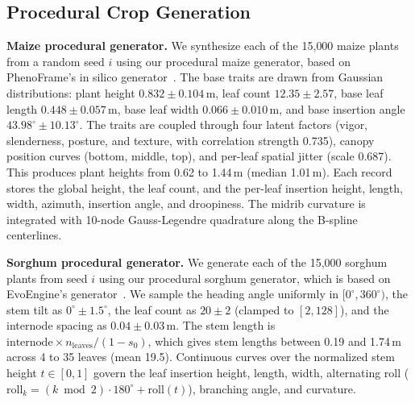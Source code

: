 \documentclass[10pt,twocolumn,letterpaper]{article}
\begin{document}
\subsection{Procedural Crop Generation}
\noindent\textbf{Maize procedural generator.}
We synthesize each of the 15{,}000 maize plants from a random seed $i$ using our procedural maize generator, based on PhenoFrame's in silico generator~\citep {vazquez_phenoframe_2026}.
The base traits are drawn from Gaussian distributions: plant height $0.832 \pm 0.104$\,m, leaf count $12.35 \pm 2.57$, base leaf length $0.448 \pm 0.057$\,m, base leaf width $0.066 \pm 0.010$\,m, and base insertion angle $43.98^\circ \pm 10.13^\circ$. The traits are coupled through four latent factors (vigor, slenderness, posture, and texture, with correlation strength 0.735), canopy position curves (bottom, middle, top), and per-leaf spatial jitter (scale 0.687). This produces plant heights from 0.62 to 1.44\,m (median 1.01\,m). Each record stores the global height, the leaf count, and the per-leaf insertion height, length, width, azimuth, insertion angle, and droopiness. The midrib curvature is integrated with 10-node Gauss-Legendre quadrature along the B-spline centerlines.

\noindent\textbf{Sorghum procedural generator.}
We generate each of the 15{,}000 sorghum plants from seed $i$ using our procedural sorghum generator, which is based on EvoEngine's generator~\citep{ostermann_sorghum_2024}.
We sample the heading angle uniformly in $[0^\circ, 360^\circ)$, the stem tilt as $0^\circ \pm 1.5^\circ$, the leaf count as $20 \pm 2$ (clamped to $[2, 128]$), and the internode spacing as $0.04 \pm 0.03$\,m. The stem length is $\text{internode} \times n_{\text{leaves}} / (1 - s_0)$, which gives stem lengths between 0.19 and 1.74\,m across 4 to 35 leaves (mean 19.5). Continuous curves over the normalized stem height $t \in [0,1]$ govern the leaf insertion height, length, width, alternating roll ($\text{roll}_k = (k \bmod 2) \cdot 180^\circ + \text{roll}(t)$), branching angle, and curvature.
\end{document}

